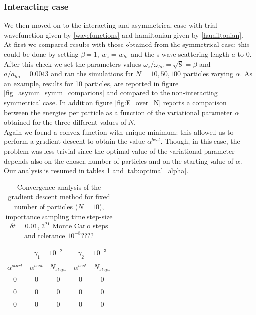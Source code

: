 \subsubsection*{Interacting case}
We then moved on to the interacting and asymmetrical case with trial wavefunction given by \ref{wavefunctions} and hamiltonian given by \ref{hamiltonian}. At first we compared results with those obtained from the symmetrical case: this could be done by setting $\beta=1$, $w_z = w_{ho}$ and the s-wave scattering length $a$ to 0. After this check we set the parameters values $\omega_z/\omega_{ho} = \sqrt{8} = \beta$ and $a/a_{ho} = 0.0043$ and ran the simulations for $N=10,50,100$ particles varying $\alpha$. As an example, results for 10 particles, are reported in figure \ref{fig_asymm_symm_comparions} and compared to the non-interacting symmetrical case. In addition figure \ref{fig:E_over_N} reports a comparison between the energies per particle as a function of the variational parameter $\alpha$ obtained for the three different values of $N$. \\
Again we found a convex function with unique minimum: this allowed us to perform a gradient descent to obtain the value $\alpha^{best}$. Though, in this case, the problem was less trivial since the optimal value of the variational parameter depends also on the chosen number of particles and on the starting value of $\alpha$. Our analysis is resumed in tables \ref{tab:best_alpha_N_fixed} and \ref{tab:optimal_alpha}.

\begin{table}[H]
    \centering
    \begin{tabular}{c|cc|cc}
            & \multicolumn{2}{c}{$\gamma_1=10^{-2}$} & \multicolumn{2}{|c|}{$\gamma_2=10^{-3}$} \vspace{1pt}\\
            \hline
            $\alpha^{start}$ & $\alpha^{best}$ & $N_{steps}$ & $\alpha^{best}$ & $N_{steps}$\\
            \hline
            $0$ & $0$ & $0$ & $0$ & $0$ \\
            $0$ & $0$ & $0$ & $0$ & $0$ \\
            $0$ & $0$ & $0$ & $0$ & $0$ \\
            \hline
        \end{tabular}
    \caption{Convergence analysis of the gradient descent method for fixed number of particles ($N=10$), importance sampling time step-size $\delta t = 0.01$, $2^{21}$ Monte Carlo steps and tolerance $10^{-8}$????}
    \label{tab:best_alpha_N_fixed}
\end{table}

